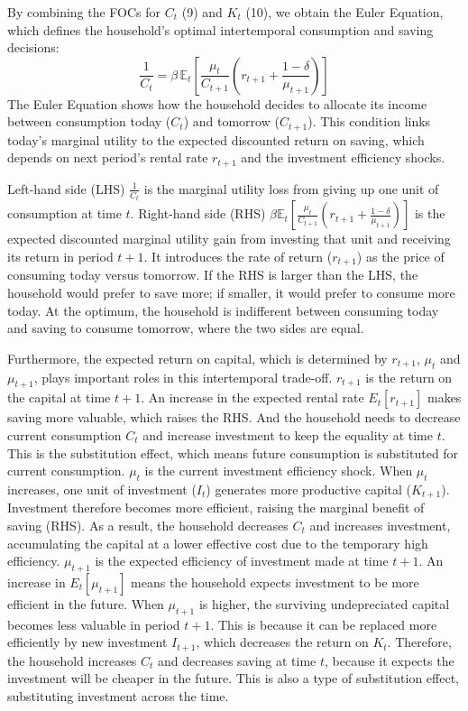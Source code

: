\documentclass[12pt]{article}
\begin{document}
By combining the FOCs for $C_t$ (9) and $K_t$ (10), we obtain the Euler Equation, which defines the household's optimal intertemporal consumption and saving decisions:
\[
\frac{1}{C_t}
= \beta \,\mathbb{E}_t \!\left[
    \frac{\mu_t}{C_{t+1}}
    \left( r_{t+1} + \frac{1-\delta}{\mu_{t+1}} \right)
\right]
\tag{12}
\]
The Euler Equation shows how the household decides to allocate its income between consumption today ($C_t$) and tomorrow ($C_{t+1}$).
This condition links today's marginal utility to the expected discounted return on saving, which depends on next period's rental rate $r_{t+1}$ and the investment efficiency shocks.

Left-hand side (LHS) $\displaystyle \frac{1}{C_t}$ is the marginal utility loss from giving up one unit of consumption at time $t$. Right-hand side (RHS) $\displaystyle 
        \beta \mathbb{E}_t \left[
        \frac{\mu_t}{C_{t+1}}
        \left( r_{t+1} + \frac{1-\delta}{\mu_{t+1}} \right)
        \right]$ is the expected discounted marginal utility gain from investing that unit and receiving its return in period $t+1$.
It introduces the rate of return ($r_{t+1}$) as the price of consuming today versus tomorrow. If the RHS is larger than the LHS, the household would prefer to save more; if smaller, it would prefer to consume more today. At the optimum, the household is indifferent between consuming today and saving to consume tomorrow, where the two sides are equal.

Furthermore, the expected return on capital, which is determined by $r_{t+1}$, $\mu_t$ and $\mu_{t+1}$, plays important roles in this intertemporal trade-off. $r_{t+1}$ is the return on the capital at time $t+1$. An increase in the expected rental rate $E_t[r_{t+1}]$ makes saving more valuable, which raises the RHS. And the household needs to decrease current consumption $C_t$ and increase investment to keep the equality at time $t$. This is the substitution effect, which means future consumption is substituted for current consumption. $\mu_t$ is the current investment efficiency shock. When $\mu_t$ increases, one unit of investment ($I_t$) generates more productive capital ($K_{t+1}$). Investment therefore becomes more efficient, raising the marginal benefit of saving (RHS). As a result, the household decreases $C_t$ and increases investment, accumulating the capital at a lower effective cost due to the temporary high efficiency. $\mu_{t+1}$ is the expected efficiency of investment made at time $t+1$. An increase in $E_t[\mu_{t+1}]$ means the household expects investment to be more efficient in the future. When $\mu_{t+1}$ is higher, the surviving undepreciated capital becomes less valuable in period $t+1$. This is because it can be replaced more efficiently by new investment $I_{t+1}$, which decreases the return on $K_t$. Therefore, the household increases $C_t$ and decreases saving at time $t$, because it expects the investment will be cheaper in the future. This is also a type of substitution effect, substituting investment across the time.
\end{document}
